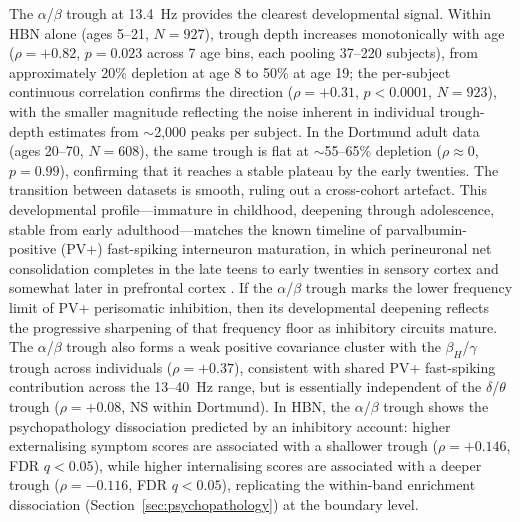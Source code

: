 The $\alpha$/$\beta$ trough at 13.4~Hz provides the clearest developmental signal. Within HBN alone (ages 5--21, $N = 927$), trough depth increases monotonically with age ($\rho = +0.82$, $p = 0.023$ across 7 age bins, each pooling 37--220 subjects), from approximately 20\% depletion at age 8 to 50\% at age 19; the per-subject continuous correlation confirms the direction ($\rho = +0.31$, $p < 0.0001$, $N = 923$), with the smaller magnitude reflecting the noise inherent in individual trough-depth estimates from $\sim$2{,}000 peaks per subject. In the Dortmund adult data (ages 20--70, $N = 608$), the same trough is flat at $\sim$55--65\% depletion ($\rho \approx 0$, $p = 0.99$), confirming that it reaches a stable plateau by the early twenties. The transition between datasets is smooth, ruling out a cross-cohort artefact. This developmental profile---immature in childhood, deepening through adolescence, stable from early adulthood---matches the known timeline of parvalbumin-positive (PV+) fast-spiking interneuron maturation, in which perineuronal net consolidation completes in the late teens to early twenties in sensory cortex and somewhat later in prefrontal cortex \parencite{hensch2005critical}. If the $\alpha$/$\beta$ trough marks the lower frequency limit of PV+ perisomatic inhibition, then its developmental deepening reflects the progressive sharpening of that frequency floor as inhibitory circuits mature. The $\alpha$/$\beta$ trough also forms a weak positive covariance cluster with the $\beta_H$/$\gamma$ trough across individuals ($\rho = +0.37$), consistent with shared PV+ fast-spiking contribution across the 13--40~Hz range, but is essentially independent of the $\delta$/$\theta$ trough ($\rho = +0.08$, NS within Dortmund). In HBN, the $\alpha$/$\beta$ trough shows the psychopathology dissociation predicted by an inhibitory account: higher externalising symptom scores are associated with a shallower trough ($\rho = +0.146$, FDR $q < 0.05$), while higher internalising scores are associated with a deeper trough ($\rho = -0.116$, FDR $q < 0.05$), replicating the within-band enrichment dissociation (Section~\ref{sec:psychopathology}) at the boundary level.

